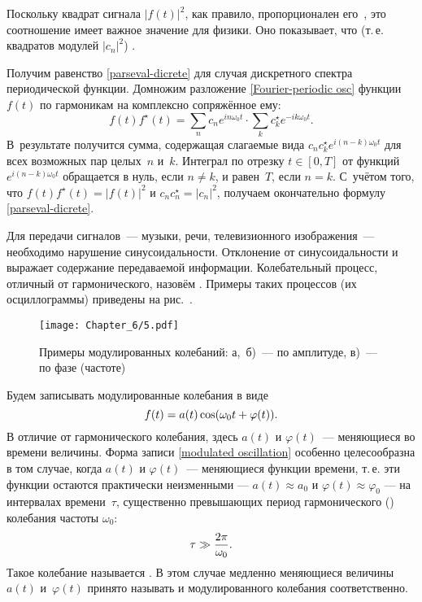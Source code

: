 Поскольку квадрат сигнала $|f(t)|^2$, как правило, пропорционален
его~, это соотношение имеет важное значение для физики.
Оно показывает, что  (т.\,е. квадратов модулей $|c_n|^2$)
.

Получим равенство \eqref{parseval-dicrete} для случая дискретного спектра
периодической функции. 
Домножим разложение
\eqref{Fourier-periodic osc} функции $f(t)$ по гармоникам на комплексно
сопряжённое ему:
\begin{equation*}f(t)f^{\star}(t) = \sum\limits_n c_n e^{i n \omega_0 t} \cdot \sum\limits_k c_k^{\star} e^{-i k \omega_0 t}.\end{equation*}
В~результате получится сумма, содержащая слагаемые вида
$c_n c_k^{\star} e^{i(n-k)\omega_0 t}$ для всех возможных пар целых~$n$ и~$k$.
Интеграл по отрезку $t\in[0,T]$ от функций $e^{i(n-k)\omega_0 t}$
обращается в нуль, если $n\ne k$, и равен~$T$, если $n=k$.
С~учётом того, что $f(t)f^{\star}(t) = |f(t)|^2$ и
$c_n c_n^{\star} = |c_n|^2$, получаем окончательно формулу
\eqref{parseval-dicrete}.




Для передачи сигналов~--- музыки, речи, телевизионного изображения~---
необходимо нарушение синусоидальности. Отклонение
от синусоидальности и выражает содержание передаваемой информации. Колебательный
процесс, отличный от гармонического,
назовём . Примеры таких процессов (их
осциллограммы) приведены на рис.~.

\begin{figure}[h!]
    \texttt{[image: Chapter\_6/5.pdf]}
    \caption{Примеры модулированных колебаний: а,~б)~--- по амплитуде,
    в)~--- по фазе (частоте)}
\end{figure}

Будем записывать модулированные колебания в виде
\begin{equation}
    \eqmark{modulated oscillation}
    f(t)=a(t)\cos(\omega_0t+\varphi(t)).
\end{equation}
В отличие от гармонического колебания, здесь $a(t)$ и $\varphi(t)$~---
меняющиеся во времени величины. Форма записи \eqref{modulated oscillation}
особенно целесообразна в том случае, когда $a(t)$ и $\varphi(t)$~---
 меняющиеся функции времени, т.\,е.
эти функции остаются практически неизменными --- $a(t)\approx a_{0}$ и
$\varphi(t)\approx\varphi_0$ --- на интервалах времени~$\tau$,
существенно превышающих период гармонического ()
колебания частоты $\omega_0$:
\begin{equation}
    \eqmark{quasiharmonic oscillation - tau}
    \tau \gg \frac{2\pi}{\omega_0}.
\end{equation}
Такое колебание называется .
В этом случае медленно меняющиеся величины~$a(t)$ и~$\varphi(t)$
принято называть  и  модулированного колебания
соответственно.

